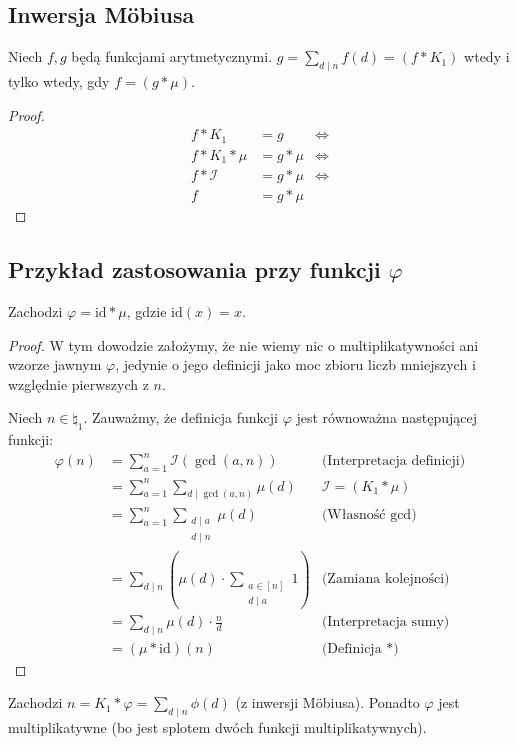 \subsection{Inwersja Möbiusa}
\begin{theorem}
	Niech $f, g$ będą funkcjami arytmetycznymi.
	$g = \sum_{d \mid n} f(d) = (f * K_1)$ wtedy i tylko wtedy,
	gdy $f = (g * \mu)$.
\end{theorem}
\begin{proof}
	\begin{align*}
		f * K_1        & = g       & \iff \\
		f * K_1 * \mu  & = g * \mu & \iff \\
		f * \mathcal I & = g * \mu & \iff \\
		f              & = g * \mu
	\end{align*}
\end{proof}

\subsection{Przykład zastosowania przy funkcji \texorpdfstring{$\varphi$}{phi}}
\begin{theorem}
	Zachodzi $\varphi = \text{id} * \mu$, gdzie $\text{id}(x) = x$.
\end{theorem}
\begin{proof}
	W tym dowodzie założymy, że nie wiemy nic o multiplikatywności ani
	wzorze jawnym $\varphi$, jedynie o jego definicji jako moc zbioru liczb
	mniejszych i względnie pierwszych z $n$.

	Niech $n \in \natural_1$.
	Zauważmy, że definicja funkcji $\varphi$ jest równoważna następującej funkcji:
	\begin{align*}
		\varphi(n) & = \sum_{a=1}^{n} \mathcal I(\gcd(a, n))                        & \text{(Interpretacja definicji)}  \\
		           & = \sum_{a=1}^{n} \sum_{d \mid \gcd(a, n)} \mu(d)               & \text{$\mathcal I = (K_1 * \mu)$} \\
		           & = \sum_{a=1}^{n} \sum_{\substack{d \mid a                                                          \\ d \mid n}} \mu(d) & \text{(Własność $\gcd$)} \\
		           & = \sum_{d \mid n} \left(\mu(d) \cdot \sum_{\substack{a \in [n]                                     \\ d \mid a}} 1 \right) & \text{(Zamiana kolejności)} \\
		           & = \sum_{d \mid n} \mu(d) \cdot \frac{n}{d}                     & \text{(Interpretacja sumy)}       \\
		           & = (\mu * \text{id})(n)                                         & \text{(Definicja $*$)}
	\end{align*}
\end{proof}

\begin{corollary}
	Zachodzi $n = K_1 * \varphi = \sum_{d \mid n} \phi(d)$ (z inwersji Möbiusa).
	Ponadto $\varphi$ jest multiplikatywne (bo jest splotem dwóch funkcji multiplikatywnych).
\end{corollary}

